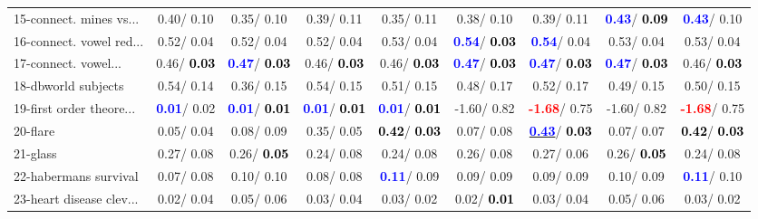 \begin{table}[h]
\begin{center}
\begin{tabular}{lc|c|c|c|c|c|c|c}
15-connect. mines vs... &   0.40/  0.10 &   0.35/  0.10 &   0.39/  0.11 &   0.35/  0.11 &   0.38/  0.10 &   0.39/  0.11 & \textcolor{blue}{\textbf{  0.43}}/\textcolor{black}{\textbf{  0.09}} & \textcolor{blue}{\textbf{  0.43}}/  0.10 \\
16-connect. vowel red... &   0.52/  0.04 &   0.52/  0.04 &   0.52/  0.04 &   0.53/  0.04 & \textcolor{blue}{\textbf{  0.54}}/\textcolor{black}{\textbf{  0.03}} & \textcolor{blue}{\textbf{  0.54}}/  0.04 &   0.53/  0.04 &   0.53/  0.04 \\
17-connect. vowel... &   0.46/\textcolor{black}{\textbf{  0.03}} & \textcolor{blue}{\textbf{  0.47}}/\textcolor{black}{\textbf{  0.03}} &   0.46/\textcolor{black}{\textbf{  0.03}} &   0.46/\textcolor{black}{\textbf{  0.03}} & \textcolor{blue}{\textbf{  0.47}}/\textcolor{black}{\textbf{  0.03}} & \textcolor{blue}{\textbf{  0.47}}/\textcolor{black}{\textbf{  0.03}} & \textcolor{blue}{\textbf{  0.47}}/\textcolor{black}{\textbf{  0.03}} &   0.46/\textcolor{black}{\textbf{  0.03}} \\
18-dbworld subjects &   0.54/  0.14 &   0.36/  0.15 &   0.54/  0.15 &   0.51/  0.15 &   0.48/  0.17 &   0.52/  0.17 &   0.49/  0.15 &   0.50/  0.15 \\
19-first order theore... & \textcolor{blue}{\textbf{  0.01}}/  0.02 & \textcolor{blue}{\textbf{  0.01}}/\textcolor{black}{\textbf{  0.01}} & \textcolor{blue}{\textbf{  0.01}}/\textcolor{black}{\textbf{  0.01}} & \textcolor{blue}{\textbf{  0.01}}/\textcolor{black}{\textbf{  0.01}} &  -1.60/  0.82 & \textcolor{red}{\textbf{ -1.68}}/  0.75 &  -1.60/  0.82 & \textcolor{red}{\textbf{ -1.68}}/  0.75 \\
20-flare &   0.05/  0.04 &   0.08/  0.09 &   0.35/  0.05 & \textcolor{black}{\textbf{  0.42}}/\textcolor{black}{\textbf{  0.03}} &   0.07/  0.08 & \underline{\textcolor{blue}{\textbf{  0.43}}}/\textcolor{black}{\textbf{  0.03}} &   0.07/  0.07 & \textcolor{black}{\textbf{  0.42}}/\textcolor{black}{\textbf{  0.03}} \\
21-glass &   0.27/  0.08 &   0.26/\textcolor{black}{\textbf{  0.05}} &   0.24/  0.08 &   0.24/  0.08 &   0.26/  0.08 &   0.27/  0.06 &   0.26/\textcolor{black}{\textbf{  0.05}} &   0.24/  0.08 \\ \hline
22-habermans survival &   0.07/  0.08 &   0.10/  0.10 &   0.08/  0.08 & \textcolor{blue}{\textbf{  0.11}}/  0.09 &   0.09/  0.09 &   0.09/  0.09 &   0.10/  0.09 & \textcolor{blue}{\textbf{  0.11}}/  0.10 \\
23-heart disease clev... &   0.02/  0.04 &   0.05/  0.06 &   0.03/  0.04 &   0.03/  0.02 &   0.02/\textcolor{black}{\textbf{  0.01}} &   0.03/  0.04 &   0.05/  0.06 &   0.03/  0.02 \\

\end{tabular}
\end{center}
\end{table}
